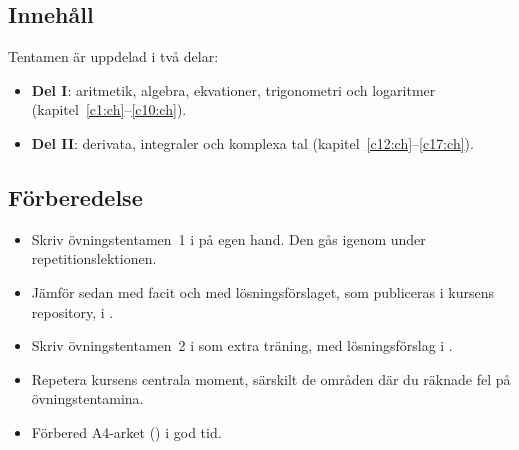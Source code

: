 \subsection{Innehåll}
\label{c19:sec:innehall}
Tentamen är uppdelad i två delar:
\begin{itemize}
  \item \textbf{Del I}: aritmetik, algebra, ekvationer, trigonometri och logaritmer
    (kapitel~\ref{c1:ch}--\ref{c10:ch}).
  \item \textbf{Del II}: derivata, integraler och komplexa tal
    (kapitel~\ref{c12:ch}--\ref{c17:ch}).
\end{itemize}

\subsection{Förberedelse}
\label{c19:sec:forberedelse}
\begin{itemize}
  \item Skriv övningstentamen~1 i  på egen hand. Den gås igenom
    under repetitionslektionen.
  \item Jämför sedan med facit och med lösningsförslaget, som publiceras i kursens repository, i
    .
  \item Skriv övningstentamen~2 i  som extra träning, med
    lösningsförslag i .
  \item Repetera kursens centrala moment, särskilt de områden där du räknade fel på
    övningstentamina.
  \item Förbered A4-arket () i god tid.
\end{itemize}
